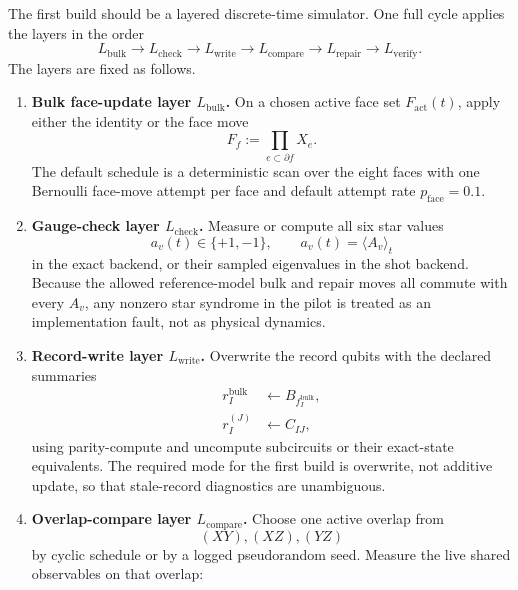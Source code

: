 \documentclass[11pt]{article}
\begin{document}
The first build should be a layered discrete-time simulator. One full cycle applies the layers in
the order
\begin{equation}
L_{\mathrm{bulk}}
\longrightarrow
L_{\mathrm{check}}
\longrightarrow
L_{\mathrm{write}}
\longrightarrow
L_{\mathrm{compare}}
\longrightarrow
L_{\mathrm{repair}}
\longrightarrow
L_{\mathrm{verify}}.
\end{equation}
The layers are fixed as follows.
\begin{enumerate}[leftmargin=2em]
\item \textbf{Bulk face-update layer $L_{\mathrm{bulk}}$.}
On a chosen active face set $F_{\mathrm{act}}(t)$, apply either the identity or the face move
\begin{equation}
F_f:=\prod_{e\subset\partial f}X_e.
\end{equation}
The default schedule is a deterministic scan over the eight faces with one Bernoulli face-move
attempt per face and default attempt rate $p_{\mathrm{face}}=0.1$.
\item \textbf{Gauge-check layer $L_{\mathrm{check}}$.}
Measure or compute all six star values
\begin{equation}
a_v(t)\in\{+1,-1\},
\qquad a_v(t)=\langle A_v\rangle_t
\end{equation}
in the exact backend, or their sampled eigenvalues in the shot backend. Because the allowed
reference-model bulk and repair moves all commute with every $A_v$, any nonzero star syndrome in the
pilot is treated as an implementation fault, not as physical dynamics.
\item \textbf{Record-write layer $L_{\mathrm{write}}$.}
Overwrite the record qubits with the declared summaries
\begin{align}
r_I^{\mathrm{bulk}} &\leftarrow B_{f_I^{\mathrm{bulk}}},\\
r_I^{(J)} &\leftarrow C_{IJ},
\end{align}
using parity-compute and uncompute subcircuits or their exact-state equivalents. The required
mode for the first build is overwrite, not additive update, so that stale-record diagnostics are
unambiguous.
\item \textbf{Overlap-compare layer $L_{\mathrm{compare}}$.}
Choose one active overlap from
\begin{equation}
(XY),(XZ),(YZ)
\end{equation}
by cyclic schedule or by a logged pseudorandom seed. Measure the live shared observables on that
overlap:
\begin{equation}

\end{equation}
\end{enumerate}
\end{document}
